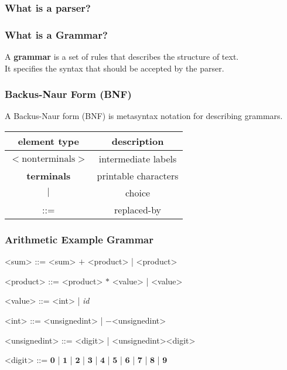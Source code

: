 \documentclass{beamer}
\begin{document}
\begin{frame}
\frametitle{What is a parser?}
\begin{center}
\scalebox{0.8}
{
}
\end{center}
\end{frame}

\begin{frame}
\frametitle{What is a Grammar?}

A \textbf{grammar} is a set of rules that describes the structure of text. \\
\bigskip
It specifies the syntax that should be accepted by the parser.
\end{frame}


\begin{frame}[fragile]
\frametitle{Backus-Naur Form (BNF)}
A Backus-Naur form (BNF) is metasyntax notation for describing grammars.

\begin{center}
  \begin{tabular}{ | c | c | }
    \hline
    element type & description \\ \hline\hline
    $<\mathrm{non terminals}>$ & intermediate labels  \\ \hline
    \textbf{terminals} & printable characters  \\ \hline
    $|$ & choice  \\ \hline
    ::= & replaced-by  \\ 
    \hline
  \end{tabular}
\end{center}

\end{frame}

\begin{frame}[fragile]
\frametitle{Arithmetic Example Grammar}
\begin{grammar}
<sum> ::= <sum> $\mathbf{+}$ <product> | <product>

<product> ::= <product> $\mathbf{*}$ <value> | <value>

<value> ::= <int> | \textit{id}

<int> ::= <unsignedint> | $\mathbf{-}$<unsignedint>

<unsignedint> ::= <digit> | <unsignedint><digit>

<digit> ::= $\mathbf{0}$ | $\mathbf{1}$ | $\mathbf{2}$ | $\mathbf{3}$ | $\mathbf{4}$ | $\mathbf{5}$ | $\mathbf{6}$ | $\mathbf{7}$ | $\mathbf{8}$ | $\mathbf{9}$
 \end{grammar}
\end{frame}
\end{document}
